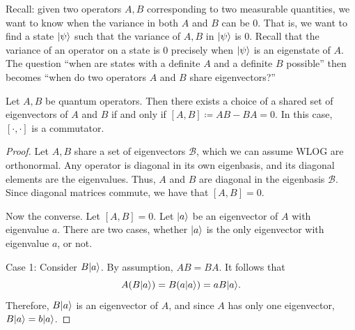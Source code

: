Recall: given two operators $A,B$ corresponding to two measurable quantities, we want to know when the variance in both $A$ and $B$ can be 0. That is, we want to find a state $\lvert\psi \rangle $ such that the variance of $A,B$ in $\lvert\psi \rangle $ is $0$. Recall that the variance of an operator on a state is 0 precisely when $\lvert\psi \rangle $ is an eigenstate of $A$. The question ``when are states with a definite $A$ and a definite $B$ possible'' then becomes ``when do two operators $A$ and $B$ share eigenvectors?''
\begin{theorem}\label{thm:1.1}
	Let $A,B$ be quantum operators. Then there exists a choice of a shared set of eigenvectors of $A$ and $B$ if and only if $[A,B]\coloneqq AB-BA=0$. In this case, $[\cdot ,\cdot ]$ is a commutator.
\end{theorem}
\begin{proof}
	Let $A,B$ share a set of eigenvectors $\mathcal{B} $, which we can assume WLOG are orthonormal. Any operator is diagonal in its own eigenbasis, and its diagonal elements are the eigenvalues. Thus, $A$ and $B$ are diagonal in the eigenbasis $\mathcal{B} $. Since diagonal matrices commute, we have that $[A,B]=0$.

	Now the converse. Let $[A,B]=0$. Let $\lvert a\rangle $ be an eigenvector of $A$ with eigenvalue $a$. There are two cases, whether $\lvert a\rangle $ is the only eigenvector with eigenvalue $a$, or not.

	Case 1: Consider $B\lvert a\rangle $. By assumption, $AB=BA$. It follows that
	\[
		A(B\lvert a\rangle )=B(a\lvert a\rangle )=aB\lvert a\rangle 
	.\]
	Therefore, $B\lvert a\rangle $ is an eigenvector of $A$, and since $A$ has only one eigenvector, $B\lvert a\rangle =b\lvert a\rangle $.
\end{proof}

